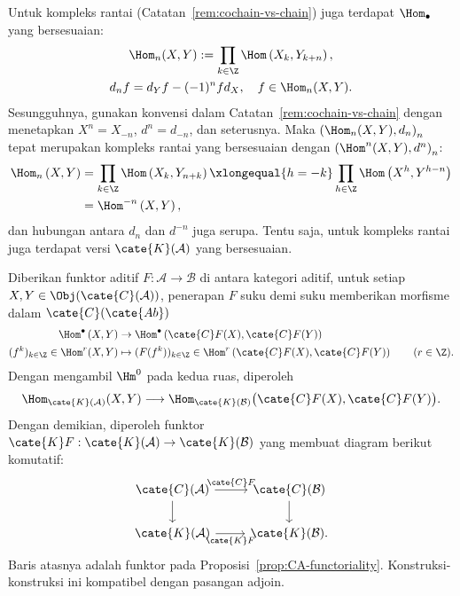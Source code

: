 \begin{catatan}
	\label{rem:Hom-chain-cplx}
	Untuk kompleks rantai (Catatan~\ref{rem:cochain-vs-chain}) juga terdapat
	$\Hom_\bullet$ yang bersesuaian:
	\begin{gather*}
		\Hom_n(X, Y) := \prod_{k \in \Z} \Hom\left(X_k, Y_{k+n} \right), \\
		d_n f = d_Y f - (-1)^n f d_X, \quad f \in \Hom_n(X, Y).
	\end{gather*}
	Sesungguhnya, gunakan konvensi dalam Catatan~\ref{rem:cochain-vs-chain} dengan
	menetapkan $X^n=X_{-n}$, $d^n=d_{-n}$, dan seterusnya. Maka
	$\left(\Hom_n(X,Y),d_n\right)_n$ tepat merupakan kompleks rantai yang
	bersesuaian dengan $\left(\Hom^n(X,Y),d^n\right)_n$:
	\begin{align*}
		\Hom_n\left(X, Y \right) & = \prod_{k \in \Z} \Hom\left( X_k, Y_{n+k} \right) \xlongequal{h = -k} \prod_{h \in \Z} \Hom\left(X^h, Y^{h-n} \right) \\
		& = \Hom^{-n} \left(X, Y\right),
	\end{align*}
	dan hubungan antara $d_n$ dan $d^{-n}$ juga serupa. Tentu saja, untuk
	kompleks rantai juga terdapat versi $\cate{K}(\mathcal{A})$ yang
	bersesuaian.
\end{catatan}

Diberikan funktor aditif $F:\mathcal{A}\to\mathcal{B}$ di antara kategori
aditif, untuk setiap $X,Y\in\Obj(\cate{C}(\mathcal{A}))$, penerapan $F$ suku
demi suku memberikan morfisme dalam $\cate{C}(\cate{Ab})$
\begin{align*}
	\Hom^\bullet\left(X, Y\right) & \to \Hom^\bullet\left(\cate{C}F(X), \cate{C}F(Y) \right) \\
	(f^k)_{k \in \Z}\in\Hom^r(X,Y) & \mapsto
	(F(f^k))_{k \in \Z}\in
	\Hom^r\left(\cate{C}F(X),\cate{C}F(Y)\right) \qquad (r\in\Z).
\end{align*}
Dengan mengambil $\Hm^0$ pada kedua ruas, diperoleh
\[
	\Hom_{\cate{K}(\mathcal{A})}(X,Y)\longrightarrow
	\Hom_{\cate{K}(\mathcal{B})}
	\bigl(\cate{C}F(X),\cate{C}F(Y)\bigr).
\]
Dengan demikian, diperoleh funktor $\cate{K}F:\cate{K}(\mathcal{A})\to
\cate{K}(\mathcal{B})$ yang membuat diagram berikut komutatif:
\begin{equation}\label{eqn:KF}\begin{tikzcd}
	\cate{C}(\mathcal{A}) \arrow[r, "{\cate{C}F}"] \arrow[d] & \cate{C}(\mathcal{B}) \arrow[d] \\
	\cate{K}(\mathcal{A}) \arrow[r, "{\cate{K}F}"'] & \cate{K}(\mathcal{B}).
\end{tikzcd}\end{equation}
Baris atasnya adalah funktor pada Proposisi~\ref{prop:CA-functoriality}.
Konstruksi-konstruksi ini kompatibel dengan pasangan adjoin.

